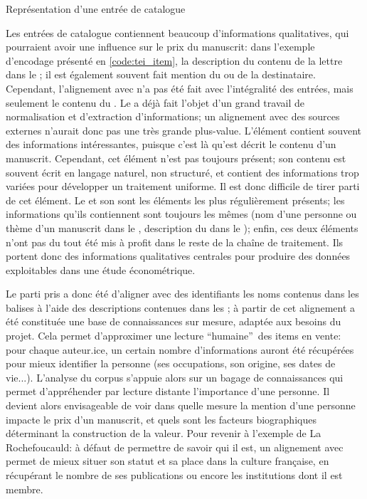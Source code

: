 \begin{listing}
	\inputminted[linenos, breaklines, tabsize=4]{xml}{code/tei_item.xml}
	\caption{Représentation \xmltei{} d'une entrée de catalogue}
	\label{code:tei_item}
\end{listing}

Les entrées de catalogue contiennent beaucoup d'informations qualitatives, qui pourraient avoir une influence sur le prix du manuscrit: dans l'exemple d'encodage présenté en \ref{code:tei_item}, la description du contenu de la lettre dans le \tnote{}; il est également souvent fait mention du ou de la destinataire. Cependant, l'alignement avec \wkd{} n'a pas été fait avec l'intégralité des entrées, mais seulement le contenu du \tname{}. Le \tdesc{} a déjà fait l'objet d'un grand travail de normalisation et d'extraction d'informations; un alignement avec des sources externes n'aurait donc pas une très grande plus-value. L'élément \tnote{} contient souvent des informations intéressantes, puisque c'est là qu'est décrit le contenu d'un manuscrit. Cependant, cet élément n'est pas toujours présent; son contenu est souvent écrit en langage naturel, non structuré, et contient des informations trop variées pour développer un traitement uniforme. Il est donc difficile de tirer parti de cet élément. Le \tname{} et son \ttrait{} sont les éléments les plus régulièrement présents; les informations qu'ils contiennent sont toujours les mêmes (nom d'une personne ou thème d'un manuscrit dans le \tname{}, description du \tname{} dans le \ttrait{}); enfin, ces deux éléments n'ont pas du tout été mis à profit dans le reste de la chaîne de traitement. Ils portent donc des informations qualitatives centrales pour produire des données exploitables dans une étude économétrique.

Le parti pris a donc été d'aligner avec des identifiants \wkd{} les noms contenus dans les balises \tname{} à l'aide des descriptions contenues dans les \ttrait{}; à partir de cet alignement a été constituée une base de connaissances sur mesure, adaptée aux besoins du projet. Cela permet d'approximer une lecture \enquote{humaine} des items en vente: pour chaque auteur.ice, un certain nombre d'informations auront été récupérées pour mieux identifier la personne (ses occupations, son origine, ses dates de vie...). L'analyse du corpus s'appuie alors sur un bagage de connaissances qui permet d'appréhender par lecture distante l'importance d'une personne. Il devient alors envisageable de voir dans quelle mesure la mention d'une personne impacte le prix d'un manuscrit, et quels sont les facteurs biographiques déterminant la construction de la valeur. Pour revenir à l'exemple de La Rochefoucauld: à défaut de permettre de savoir qui il est, un alignement avec \wkd{} permet de mieux situer son statut et sa place dans la culture française, en récupérant le nombre de ses publications ou encore les institutions dont il est membre.


